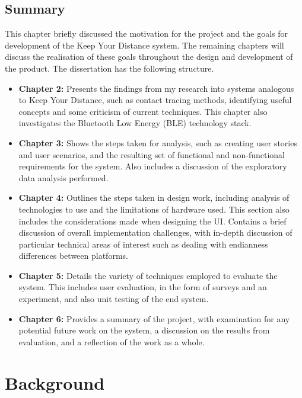 \documentclass{l4proj}
\begin{document}
\section{Summary}
This chapter briefly discussed the motivation for the project and the goals for development of the Keep Your Distance system. The remaining chapters will discuss the realisation of these goals throughout the design and development of the product. The dissertation has the following structure.
\begin{itemize}
    \item \textbf{Chapter 2:} Presents the findings from my research into systems analogous to Keep Your Distance, such as contact tracing methods, identifying useful concepts and some criticism of current techniques. This chapter also investigates the Bluetooth Low Energy (BLE) technology stack.
    \item \textbf{Chapter 3:} Shows the steps taken for analysis, such as creating user stories and user scenarios, and the resulting set of functional and non-functional requirements for the system. Also includes a discussion of the exploratory data analysis performed.
    \item \textbf{Chapter 4:} Outlines the steps taken in design work, including analysis of technologies to use and the limitations of hardware used. This section also includes the considerations made when designing the UI. Contains a brief discussion of overall implementation challenges, with in-depth discussion of particular technical  areas of interest such as dealing with endianness differences between platforms.
    \item \textbf{Chapter 5:} Details the variety of techniques employed to evaluate the system. This includes user evaluation, in the form of surveys and an experiment, and also unit testing of the end system.
    \item \textbf{Chapter 6:} Provides a summary of the project, with examination for any potential future work on the system, a discussion on the results from evaluation, and a reflection of the work as a whole.
\end{itemize}



\chapter{Background}
\end{document}
